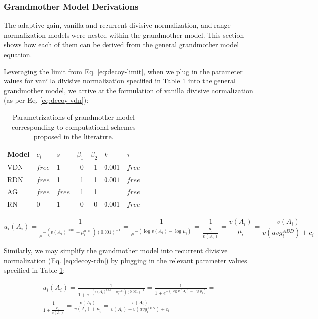 \documentclass[a4paper, nobind]{templates/ociamthesis}
\begin{document}
\hypertarget{grandmother-model-derivations}{%
\subsubsection{Grandmother Model Derivations}\label{grandmother-model-derivations}}

The adaptive gain, vanilla and recurrent divisive normalization, and range normalization models were nested within the grandmother model. This section shows how each of them can be derived from the general grandmother model equation.

Leveraging the limit from Eq. \eqref{eq:decoy-limit}, when we plug in the parameter values for vanilla divisive normalization specified in Table \ref{tab:decoy-table-grandmother} into the general grandmother model, we arrive at the formulation of vanilla divisive normalization (as per Eq. \eqref{eq:decoy-vdn}):

\begin{table}

\caption{\label{tab:decoy-table-grandmother}Parametrizations of grandmother model corresponding to computational schemes proposed in the literature.}
\centering
\begin{tabular}[t]{lllrrll}
\toprule
Model & $c_i$ & $s$ & $\beta_1$ & $\beta_2$ & $k$ & $\tau$\\
\midrule
VDN & $free$ & 1 & 0 & 1 & 0.001 & $free$\\
RDN & $free$ & 1 & 1 & 1 & $0.001$ & $free$\\
AG & $free$ & $free$ & 1 & 1 & $1$ & $free$\\
RN & 0 & 1 & 0 & 0 & 0.001 & $free$\\
\bottomrule
\end{tabular}
\end{table}

\begin{equation}
u_i(A_i) = \frac{1}{e^{-(v(A_i)^{0.001}-\mu_i^{0.001})(0.001)^{-1}}} = \frac{1}{e^{-(\log{v(A_i)}-\log{\mu_i})}} = \frac{1}{\frac{\mu_i}{v(A_i)}} = {\frac{v(A_i)}{\mu_i}} = {\frac{v(A_i)}{v(avg^{ABD}_i)+c_i}}
\end{equation}

Similarly, we may simplify the grandmother model into recurrent divisive normalization (Eq. \eqref{eq:decoy-rdn}) by plugging in the relevant parameter values specified in Table \ref{tab:decoy-table-grandmother}:

\begin{equation}
\begin{aligned}
u_i(A_i) = \frac{1}{1+e^{-(v(A_i)^{0.001}-\mu_i^{0.001})(0.001)^{-1}}} = \frac{1}{1+e^{-(\log{v(A_i)}-\log{\mu_i})}} = \\
\frac{1}{1+\frac{\mu_i}{v(A_i)}} = {\frac{v(A_i)}{v(A_i)+\mu_i}} = {\frac{v(A_i)}{v(A_i)+v(avg^{ABD}_i)+c_i}}
\end{aligned}
\end{equation}
\end{document}
